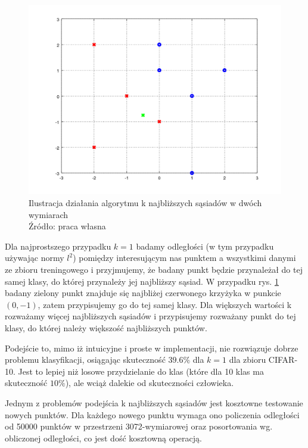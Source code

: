 \begin{figure}[h!tb]
	 \centering
	 \includegraphics[width = 1.0\linewidth]{img/knear}
	 \caption{Ilustracja działania algorytmu k najbliższych sąsiadów w dwóch wymiarach \\
              Źródło: praca własna}
	 \label{fig:knearest}
\end{figure}

Dla najprostszego przypadku $k=1$ badamy odległości (w tym przypadku używając normy $l^2$) pomiędzy interesującym nas punktem a wszystkimi danymi ze zbioru treningowego i przyjmujemy, że badany punkt będzie przynależał do tej samej klasy, do której przynależy jej najbliższy sąsiad.
W przypadku rys. \ref{fig:knearest} badany zielony punkt znajduje się najbliżej czerwonego krzyżyka w punkcie $(0,-1)$, zatem przypisujemy go do tej samej klasy.
Dla większych wartości k rozważamy więcej najbliższych sąsiadów i przypisujemy rozważany punkt do tej klasy, do której należy większość najbliższych punktów.

Podejście to, mimo iż intuicyjne i proste w implementacji, nie rozwiązuje dobrze problemu klasyfikacji, osiągając skuteczność $39.6\%$ dla $k = 1$ dla zbioru CIFAR-10.
Jest to lepiej niż losowe przydzielanie do klas (które dla 10 klas ma skuteczność $10\%$), ale wciąż dalekie od skuteczności człowieka.

Jednym z problemów podejścia k najbliższych sąsiadów jest kosztowne testowanie nowych punktów.
Dla każdego nowego punktu wymaga ono policzenia odległości od 50000 punktów w przestrzeni 3072-wymiarowej oraz posortowania wg. obliczonej odległości, co jest dość kosztowną operacją.

